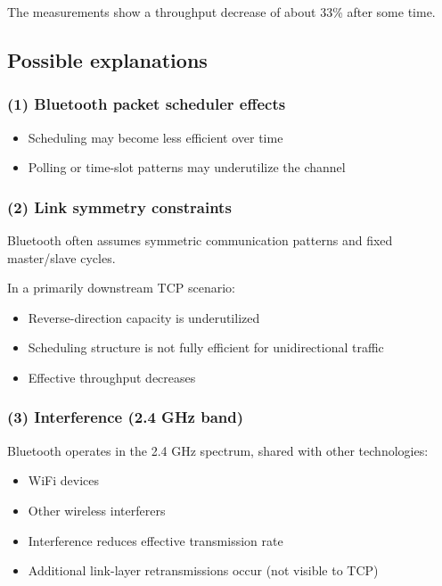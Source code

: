 The measurements show a throughput decrease of about 33\% after some time.

\subsection*{Possible explanations}

\subsubsection*{(1) Bluetooth packet scheduler effects}

\begin{itemize}
    \item Scheduling may become less efficient over time
    \item Polling or time-slot patterns may underutilize the channel
\end{itemize}

\subsubsection*{(2) Link symmetry constraints}

Bluetooth often assumes symmetric communication patterns and fixed master/slave cycles.

In a primarily downstream TCP scenario:

\begin{itemize}
    \item Reverse-direction capacity is underutilized
    \item Scheduling structure is not fully efficient for unidirectional traffic
    \item Effective throughput decreases
\end{itemize}

\subsubsection*{(3) Interference (2.4 GHz band)}

Bluetooth operates in the 2.4 GHz spectrum, shared with other technologies:

\begin{itemize}
    \item WiFi devices
    \item Other wireless interferers
\end{itemize}

\begin{itemize}
    \item Interference reduces effective transmission rate
    \item Additional link-layer retransmissions occur (not visible to TCP)
\end{itemize}

